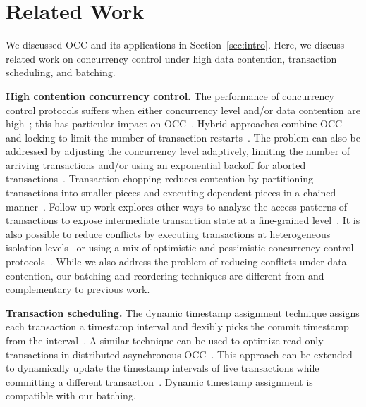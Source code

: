 \section{Related Work}\label{sec:relwork}
We discussed OCC and its applications in Section~\ref{sec:intro}. 
Here, we discuss related work on concurrency control under high data contention, transaction scheduling, and batching. 

{\bf High contention concurrency control.}
The performance of concurrency control protocols suffers when either concurrency level and/or data contention are high~\cite{franaszek1985limitations, appuswamy17vldb}; this has particular impact on OCC~\cite{agrawal1987concurrency}. Hybrid approaches combine OCC and locking to limit the number of transaction restarts~\cite{thomasian1998distributed,yu1992analysis}. The problem can also be addressed by adjusting the concurrency level adaptively, limiting the number of arriving transactions and/or using an exponential backoff for aborted transactions~\cite{helal1993adaptive}. Transaction chopping reduces contention by partitioning transactions into smaller pieces and executing dependent pieces in a chained manner~\cite{mu2014extracting,shasha1995transaction,xie2015high}. Follow-up work explores other ways to analyze the access patterns of transactions to expose intermediate transaction state at a fine-grained level~\cite{wang2016scaling}. It is also possible to reduce conflicts by executing transactions at heterogeneous isolation levels~\cite{xie2014salt,xie2015high} or using a mix of optimistic and pessimistic concurrency control protocols~\cite{wang2016mostly}. While we also address the problem of reducing conflicts under data contention, our batching and reordering techniques are different from and complementary to previous work.

{\bf Transaction scheduling.}
The dynamic timestamp assignment technique assigns each transaction a timestamp interval and flexibly picks the commit timestamp from the interval~\cite{bayer1982dynamic}. A similar technique can be used to optimize read-only transactions in distributed asynchronous OCC~\cite{ding2015centiman}. This approach can be extended to dynamically update the timestamp intervals of live transactions while committing a different transaction~\cite{boksenbaum1987concurrent}. Dynamic timestamp assignment is compatible with our batching.

